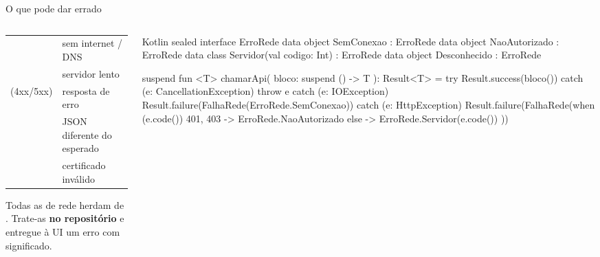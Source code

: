 \documentclass[aspectratio=169,10pt]{beamer}
\begin{document}
\begin{frame}[fragile]{O que pode dar errado}
  \begin{columns}[T]
    \begin{column}{0.5\textwidth}
      \scriptsize
      \begin{tabularx}{\linewidth}{@{}l L@{}}
        \toprule
         &  \\
        \midrule
         & sem internet / DNS \\
         & servidor lento \\
         (4xx/5xx) & resposta de erro \\
         & JSON diferente do esperado \\
         & certificado inválido \\
        \bottomrule
      \end{tabularx}
      \begin{atencao}
        Todas as de rede herdam de . Trate-as \textbf{no repositório} e entregue à UI um erro com significado.
      \end{atencao}
    \end{column}
    \begin{column}{0.48\textwidth}
\begin{codigo}[title=Erros com significado]{Kotlin}
sealed interface ErroRede {
  data object SemConexao : ErroRede
  data object NaoAutorizado : ErroRede
  data class Servidor(val codigo: Int) : ErroRede
  data object Desconhecido : ErroRede
}

suspend fun <T> chamarApi(
  bloco: suspend () -> T
): Result<T> = try {
  Result.success(bloco())
} catch (e: CancellationException) { throw e
} catch (e: IOException) {
  Result.failure(FalhaRede(ErroRede.SemConexao))
} catch (e: HttpException) {
  Result.failure(FalhaRede(when (e.code()) {
    401, 403 -> ErroRede.NaoAutorizado
    else -> ErroRede.Servidor(e.code()) }))
}
\end{codigo}
    \end{column}
  \end{columns}
\end{frame}
\end{document}

